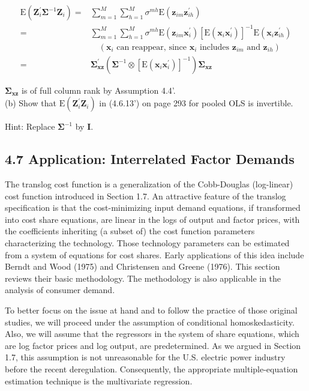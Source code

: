 \documentclass[10pt]{article}
\begin{document}
$$
\begin{aligned}
\mathrm{E}\left(\mathbf{Z}_{i}^{\prime} \boldsymbol{\Sigma}^{-1} \mathbf{Z}_{i}\right)= & \sum_{m=1}^{M} \sum_{h=1}^{M} \sigma^{m h} \mathrm{E}\left(\mathbf{z}_{i m} \mathbf{z}_{i h}^{\prime}\right) \\
= & \sum_{m=1}^{M} \sum_{h=1}^{M} \sigma^{m h} \mathrm{E}\left(\mathbf{z}_{i m} \mathbf{x}_{i}^{\prime}\right)\left[\mathrm{E}\left(\mathbf{x}_{i} \mathbf{x}_{i}^{\prime}\right)\right]^{-1} \mathrm{E}\left(\mathbf{x}_{i} \mathbf{z}_{i h}^{\prime}\right) \\
& \quad\left(\mathbf{x}_{i} \text { can reappear, since } \mathbf{x}_{i} \text { includes } \mathbf{z}_{i m} \text { and } \mathbf{z}_{i h}\right) \\
= & \boldsymbol{\Sigma}_{\mathbf{x z}}^{\prime}\left(\boldsymbol{\Sigma}^{-1} \otimes\left[\mathrm{E}\left(\mathbf{x}_{i} \mathbf{x}_{i}^{\prime}\right)\right]^{-1}\right) \boldsymbol{\Sigma}_{\mathbf{x z}}
\end{aligned}
$$

$\boldsymbol{\Sigma}_{\mathbf{x z}}$ is of full column rank by Assumption 4.4'.\\
(b) Show that $\mathrm{E}\left(\mathbf{Z}_{i}^{\prime} \mathbf{Z}_{i}\right)$ in (4.6.13') on page 293 for pooled OLS is invertible.

Hint: Replace $\boldsymbol{\Sigma}^{-1}$ by $\mathbf{I}$.

\subsection*{4.7 Application: Interrelated Factor Demands}
The translog cost function is a generalization of the Cobb-Douglas (log-linear) cost function introduced in Section 1.7. An attractive feature of the translog specification is that the cost-minimizing input demand equations, if transformed into cost share equations, are linear in the logs of output and factor prices, with the coefficients inheriting (a subset of) the cost function parameters characterizing the technology. Those technology parameters can be estimated from a system of equations for cost shares. Early applications of this idea include Berndt and Wood (1975) and Christensen and Greene (1976). This section reviews their basic methodology. The methodology is also applicable in the analysis of consumer demand.

To better focus on the issue at hand and to follow the practice of those original studies, we will proceed under the assumption of conditional homoskedasticity. Also, we will assume that the regressors in the system of share equations, which are log factor prices and log output, are predetermined. As we argued in Section 1.7, this assumption is not unreasonable for the U.S. electric power industry before the recent deregulation. Consequently, the appropriate multiple-equation estimation technique is the multivariate regression.
\end{document}

